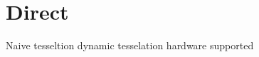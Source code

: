 
\section{Direct}
Naive
tesseltion\cite{khronostessellation}
dynamic tesselation
hardware supported
